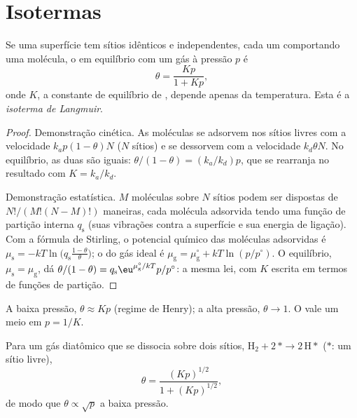 \section{Isotermas}

\begin{theorem}\label{thm:b3:surfaces-catalysis:langmuir}
Se uma superfície tem sítios idênticos e independentes, cada um comportando uma
molécula, o  em equilíbrio com um gás à pressão $p$ é
\[
  \theta = \frac{Kp}{1 + Kp},
\]
onde $K$, a constante de equilíbrio de , depende apenas da temperatura.
Esta é a \emph{isoterma de Langmuir}.
\end{theorem}

\begin{proof}
Demonstração cinética. As moléculas se adsorvem nos sítios livres com a velocidade
$k_ap(1 - \theta)N$ ($N$ sítios) e se dessorvem com a velocidade $k_d\theta N$. No equilíbrio,
as duas são iguais: $\theta/(1 - \theta)
= (k_a/k_d)p$, que se rearranja no resultado com $K = k_a/k_d$.

Demonstração estatística. $M$ moléculas sobre $N$ sítios podem ser dispostas de $N!/(M!(N - M)!)$
maneiras, cada molécula adsorvida tendo uma função de partição interna $q_{\mathrm s}$
(suas vibrações contra a superfície e sua energia de ligação). Com a fórmula de
Stirling, o potencial químico das moléculas adsorvidas é $\mu_{\mathrm s} = -kT\ln\bigl(q_{\mathrm s}\frac{1 - \theta}{\theta}\bigr)$;
o do gás ideal é $\mu_{\mathrm g} = \mu_{\mathrm g}^\circ + kT\ln(p/p^\circ)$. O equilíbrio, $\mu_{\mathrm s} = \mu_{\mathrm g}$, dá
$\theta/(1 - \theta) = q_{\mathrm s}\eu^{\mu_{\mathrm g}^\circ/kT}p/p^\circ$: a mesma lei, com $K$ escrita em termos de
funções de partição.
\end{proof}

A baixa pressão, $\theta \approx Kp$ (regime de Henry); a alta pressão, $\theta \to 1$. O  vale um meio em $p = 1/K$.

\begin{proposition}\label{prop:b3:surfaces-catalysis:dissociative}
Para um gás diatômico que se dissocia sobre dois sítios, $\mathrm{H_2} + 2\,{*} \to 2\,\mathrm{H}{*}$ (${*}$: um sítio livre),
\[
  \theta = \frac{(Kp)^{1/2}}{1 + (Kp)^{1/2}},
\]
de modo que $\theta \propto \sqrt p$ a baixa pressão.
\end{proposition}


